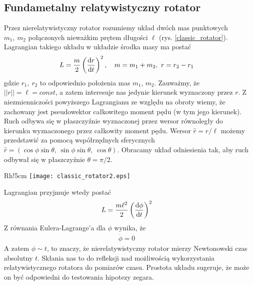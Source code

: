 \subsection{Fundametalny relatywistyczny rotator}
Przez nierelatywistyczny rotator rozumiemy układ dwóch mas punktowych
$m_1,\ m_2$ połączonych nieważkim
prętem długości $\ell$ (rys. \ref{classic_rotator}). Lagrangian 
takiego układu w układzie środka masy ma postać~\cite{landau1978krotki}
\begin{align*}
L = \frac{m }{2} \left(\frac{\text{d} r}{\text{d} t}\right)^2, 
\quad m=m_1+m_2,\ r=r_2-r_1
\end{align*}
gdzie $r_1,\ r_2$ to odpowiednio położenia mas $m_1$, $m_2$.
Zauważmy, że $||r|| =\ell = const$, a zatem interesuje nas jedynie kierunek 
wyznaczony przez $r$.
Z niezmienniczości powyższego Lagrangianu ze względu na obroty wiemy, że
 zachowany jest pseudowektor całkowitego
moment pędu (w tym jego kierunek). Ruch
odbywa się w płaszczyźnie wyznaczonej przez 
wersor równoległy do kierunku wyznaczonego 
przez całkowity moment pędu.
Wersor $ \hat{r} = r / \ell$ możemy przedstawić za pomocą  
współrzędnych sferycznych
 $\hat{r} = ( \cos \phi \sin\theta, \ \sin\phi\sin\theta,\ \cos\theta )$.
Obracamy układ odniesienia tak, aby ruch odbywał się w
 płaszczyźnie $\theta = \pi/2$. 
\begin{wrapfigure}{Rh!}{5cm}
\centering
\texttt{[image: classic\_rotator2.eps]}
\caption{Klasyczny rotator.
}
\label{classic_rotator}
\end{wrapfigure}
Lagrangian 
przyjmuje wtedy postać
\begin{align*}
L = \frac{m\ell^2 }{2} \left(\frac{\text{d} \phi}{\text{d} t}\right)^2
\end{align*}
Z równania Eulera-Lagrange'a dla $\phi$ wynika, że 
\begin{align*}
\ddot{\phi} = 0
\end{align*}
A zatem $\phi \sim t$, to znaczy, że 
nierelatywistyczny rotator mierzy Newtonowski czas
absolutny $t$. Skłania nas to do refleksji nad możliwością 
wykorzystania relatywistycznego rotatora 
do pomiarów czasu. Prostota układu sugeruje, że 
może on być odpowiedni do testowania hipotezy zegara.

